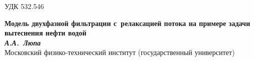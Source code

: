 {\noindent УДК 532.546}\\
\begin{center}
{\bf \large Модель двухфазной фильтрации с~релаксацией потока на примере 
задачи вытеснения нефти водой}\\
{\textbf{\textit { А.А.~Люпа}}}\\ \medskip
{ Московский физико-технический институт (государственный университет)}\\
\end{center}

